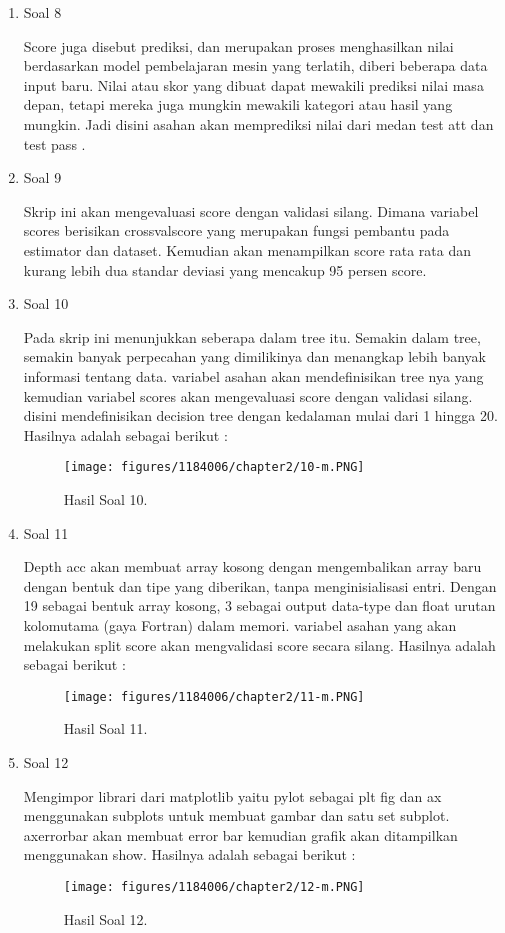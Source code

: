 \begin{enumerate}
	\item Soal 8
	\hfill\break
	
	Score juga disebut prediksi, dan merupakan proses menghasilkan nilai berdasarkan model pembelajaran mesin yang terlatih, diberi beberapa data input baru. Nilai atau skor yang dibuat dapat mewakili prediksi nilai masa depan, tetapi mereka juga mungkin mewakili kategori atau hasil yang mungkin. Jadi disini asahan akan memprediksi nilai dari medan test att dan test pass .
\item Soal 9
	\hfill\break
	
	Skrip ini akan mengevaluasi score dengan validasi silang. Dimana variabel scores berisikan crossvalscore yang merupakan fungsi pembantu pada estimator dan dataset. Kemudian akan menampilkan score rata rata dan kurang lebih dua standar deviasi yang mencakup 95 persen score. 
	\item Soal 10
	\hfill\break
	
	Pada skrip ini menunjukkan seberapa dalam tree itu. Semakin dalam tree, semakin banyak perpecahan yang dimilikinya dan menangkap lebih banyak informasi tentang data. variabel asahan akan mendefinisikan tree nya yang kemudian variabel scores akan mengevaluasi score dengan validasi silang. disini mendefinisikan decision tree dengan kedalaman mulai dari 1 hingga 20. Hasilnya adalah sebagai berikut :
	\begin{figure}[h]
	\centering
		\texttt{[image: figures/1184006/chapter2/10-m.PNG]}
		\caption{Hasil Soal 10.}
	\end{figure}
\item Soal 11
	\hfill\break
	
	Depth acc akan membuat array kosong dengan mengembalikan array baru dengan bentuk dan tipe yang diberikan, tanpa menginisialisasi entri. Dengan 19 sebagai bentuk array kosong, 3 sebagai output data-type dan float urutan kolomutama (gaya Fortran) dalam memori. variabel asahan yang akan melakukan split score akan mengvalidasi score secara silang. Hasilnya adalah sebagai berikut :
	\begin{figure}[h]
	\centering
		\texttt{[image: figures/1184006/chapter2/11-m.PNG]}
		\caption{Hasil Soal 11.}
	\end{figure}
	\item Soal 12
	\hfill\break
	
	Mengimpor librari dari matplotlib yaitu pylot sebagai plt fig dan ax menggunakan subplots untuk membuat gambar dan satu set subplot. axerrorbar akan membuat error bar kemudian grafik akan ditampilkan menggunakan show. Hasilnya adalah sebagai berikut :
	\begin{figure}
	\centering
		\texttt{[image: figures/1184006/chapter2/12-m.PNG]}
		\caption{Hasil Soal 12.}
	\end{figure}
\end{enumerate}
